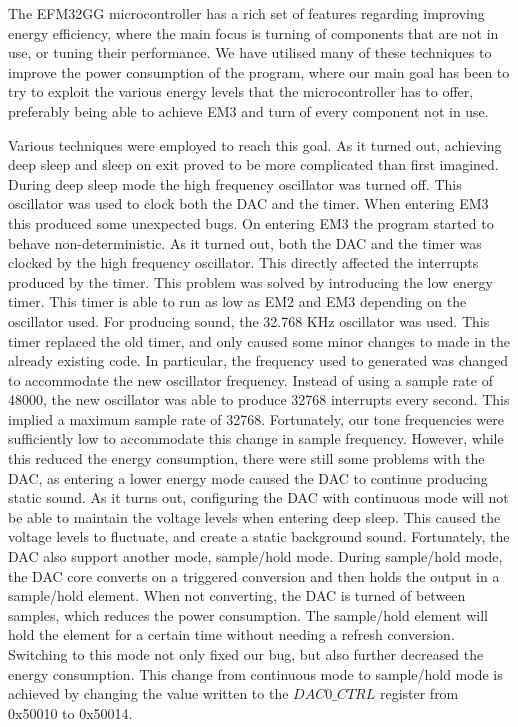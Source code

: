 The EFM32GG microcontroller has a rich set of features regarding improving energy efficiency, where the main focus is turning of components that are not in use, or tuning their performance. We have utilised many of these techniques to improve the power consumption of the program, where our main goal has been to try to exploit the various energy levels that the microcontroller has to offer, preferably being able to achieve EM3 and turn of every component not in use. 

Various techniques were employed to reach this goal. As it turned out, achieving deep sleep and sleep on exit proved to be more complicated than first imagined. During deep sleep mode the high frequency oscillator was turned off. This oscillator was used to clock both the DAC and the timer. When entering EM3 this produced some unexpected bugs. On entering EM3 the program started to behave non-deterministic. As it turned out, both the DAC and the timer was clocked by the high frequency oscillator. This directly affected the interrupts produced by the timer. This problem was solved by introducing the low energy timer. This timer is able to run as low as EM2 and EM3 depending on the oscillator used. For producing sound, the 32.768 KHz oscillator was used. This timer replaced the old timer, and only caused some minor changes to made in the already existing code. In particular, the frequency used to generated was changed to accommodate the new oscillator frequency. Instead of  using a sample rate of 48000, the new oscillator was able to produce 32768 interrupts every second. This implied a maximum sample rate of 32768. Fortunately, our tone frequencies were sufficiently low to accommodate this change in sample frequency. However, while this reduced the energy consumption, there were still some problems with the DAC, as entering a lower energy mode caused the DAC to continue producing static sound. As it turns out, configuring the DAC with continuous mode will not be able to maintain the voltage levels when entering deep sleep. This caused the voltage levels to fluctuate, and create a static background sound. Fortunately, the DAC also support another mode, sample/hold mode. During sample/hold mode, the DAC core converts on a triggered conversion and then holds the output in a sample/hold element. When not converting, the DAC is turned of between samples, which reduces the power consumption. The sample/hold element will hold the element for a certain time without needing a refresh conversion\cite{EFM32GG-rm}. Switching to this mode not only fixed our bug, but also further decreased the energy consumption. This change from continuous mode to sample/hold mode is achieved by changing the value written to the $DAC0\_CTRL$ register from 0x50010 to 0x50014. 


